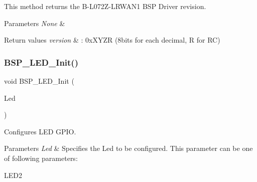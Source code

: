 This method returns the B-\/\+L072\+Z-\/\+L\+R\+W\+A\+N1 B\+SP Driver revision. 


\begin{DoxyParams}{Parameters}
{\em None} & \\
\hline
\end{DoxyParams}

\begin{DoxyRetVals}{Return values}
{\em version} & \+: 0x\+X\+Y\+ZR (8bits for each decimal, R for RC) \\
\hline
\end{DoxyRetVals}
\mbox{\label{group__B-L072Z-LRWAN1__LOW__LEVEL__Exported__Functions_gab58a4f16a476a53653c5c400e3bed158}} 
\subsubsection{\texorpdfstring{B\+S\+P\+\_\+\+L\+E\+D\+\_\+\+Init()}{BSP\_LED\_Init()}}
{\footnotesize\ttfamily void B\+S\+P\+\_\+\+L\+E\+D\+\_\+\+Init (\begin{DoxyParamCaption}\item[{\hyperlink{group__B-L072Z-LRWAN1__LOW__LEVEL__Exported__Types_gaa059704b7ca945eb9c1e7f2c3d03fecd}{Led\+\_\+\+Type\+Def}}]{Led }\end{DoxyParamCaption})}



Configures L\+ED G\+P\+IO. 


\begin{DoxyParams}{Parameters}
{\em Led} & Specifies the Led to be configured. This parameter can be one of following parameters\+: \begin{DoxyItemize}
\item L\+E\+D2 \end{DoxyItemize}
\\
\hline
\end{DoxyParams}

